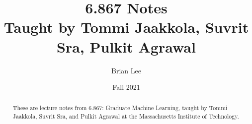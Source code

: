 \documentclass[11pt]{scrartcl}
\title{\Large 6.867 Notes\\ 
\large Taught by Tommi Jaakkola, Suvrit Sra, Pulkit Agrawal}
\subtitle{}
\author{\small Brian Lee}
\date{\small Fall 2021}
\begin{document}
\maketitle

\begin{abstract}
    These are lecture notes from 6.867: Graduate Machine Learning, taught by Tommi Jaakkola, Suvrit Sra, and Pulkit Agrawal at the Massachusetts Institute of Technology.
\end{abstract}

\tableofcontents




\end{document}

